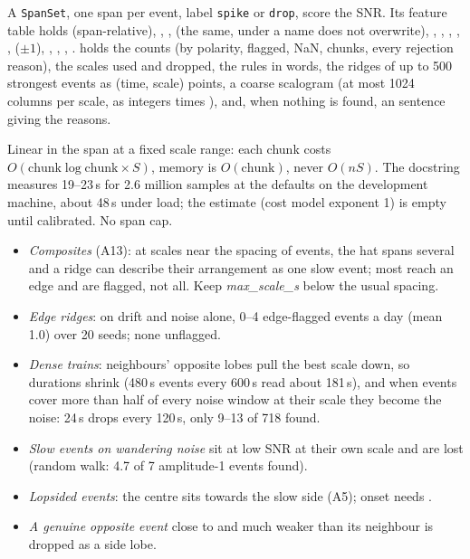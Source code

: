 A \texttt{SpanSet}, one span per event, label \texttt{spike} or \texttt{drop}, score the SNR.
Its feature table holds  (span-relative), ,
,  (the same, under a name 
does not overwrite), , , , ,
,  ($\pm1$), , ,
, .  holds the counts (by polarity, flagged,
NaN, chunks, every rejection reason), the scales used and dropped, the rules in words, the
ridges of up to 500 strongest events as (time, scale) points, a coarse scalogram (at most 1024
columns per scale, as integers times ), and, when nothing is found, an
 sentence giving the reasons.

Linear in the span at a fixed scale range: each chunk costs $O(\text{chunk}\log\text{chunk}
\times S)$, memory is $O(\text{chunk})$, never $O(nS)$. The docstring measures 19--23\,s for
2.6 million samples at the defaults on the development machine, about 48\,s under load; the
estimate (cost model exponent 1) is empty until calibrated. No span cap.

\begin{itemize}
\item \emph{Composites} (A13): at scales near the spacing of events, the hat spans several and
  a ridge can describe their arrangement as one slow event; most reach an edge and are flagged,
  not all. Keep \emph{max\_scale\_s} below the usual spacing.
\item \emph{Edge ridges}: on drift and noise alone, 0--4 edge-flagged events a day (mean 1.0)
  over 20 seeds; none unflagged.
\item \emph{Dense trains}: neighbours' opposite lobes pull the best scale down, so durations
  shrink (480\,s events every 600\,s read about 181\,s), and when events cover more than half of
  every noise window at their scale they become the noise: 24\,s drops every 120\,s, only 9--13
  of 718 found.
\item \emph{Slow events on wandering noise} sit at low SNR at their own scale and are lost
  (random walk: 4.7 of 7 amplitude-1 events found).
\item \emph{Lopsided events}: the centre sits towards the slow side (A5); onset needs
  .
\item \emph{A genuine opposite event} close to and much weaker than its neighbour is dropped as
  a side lobe.
\end{itemize}

